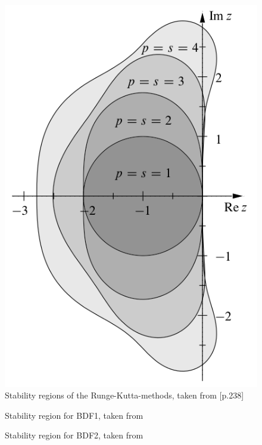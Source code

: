 \documentclass{scrartcl}
\begin{document}

\begin{figure}[h]
\centering
\begin{minipage}[b]{0.45\textwidth}
\centering
\includegraphics[width=\textwidth]{../Drawings/Runge_Kutter_stability_regions}
\caption{Stability regions of the Runge-Kutta-methods, taken from \cite{Stab_RK}[p.238]}
\end{minipage}
\end{figure}

\begin{figure}[h]
\centering
\begin{minipage}[b]{0.45\textwidth}
\centering
\hspace*{-1cm}
\scalebox{0.42}{

}
\caption{Stability region for BDF1, taken from \cite{Stab_BDF}}
\end{minipage}
\hfill
\begin{minipage}[b]{0.45\textwidth}
\centering
\hspace*{-1cm}
\scalebox{0.42}{

}
\caption{Stability region for BDF2, taken from \cite{Stab_BDF}}
\end{minipage}
\end{figure}
\end{document}
